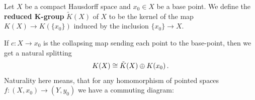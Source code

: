 \begin{definition}\label{def:kTheo-reducedKTheory}
	Let $X$ be a compact Hausdorff space and $x_0\in X$ be a base point. We define the \textbf{reduced K-group} $\tilde{K}(X)$ of $X$ to be the kernel of the map $K(X)\to K(\{x_0\})$ induced by the inclusion $\{x_0\}\to X$.	
\end{definition}
\begin{corollary}\label{cor:kTheo-splittingReducedGroupNatural}
	If $c:X\to x_0$ is the collapsing map sending each point to the base-point, then we get a natural splitting 
	\begin{align*}
		K(X)\cong \Tilde{K}(X) \oplus K(x_0) \, .
	\end{align*}  Naturality here means, that for any homomorphism of pointed spaces $f:(X,x_0)\to (Y,y_0)$ we have a commuting diagram:
	\begin{center}
	\end{center}
\end{corollary}
